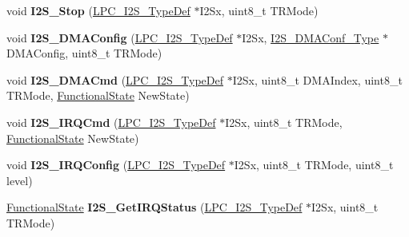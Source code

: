 \begin{DoxyCompactItemize}
\item 
\hypertarget{group___i2_s___public___functions_ga8eae165238c77e72233ac1713c8d7ba3}{void {\bfseries \-I2\-S\-\_\-\-Stop} (\hyperlink{struct_l_p_c___i2_s___type_def}{\-L\-P\-C\-\_\-\-I2\-S\-\_\-\-Type\-Def} $\ast$\-I2\-Sx, uint8\-\_\-t \-T\-R\-Mode)}\label{group___i2_s___public___functions_ga8eae165238c77e72233ac1713c8d7ba3}

\item 
\hypertarget{group___i2_s___public___functions_ga6fa654a968a57d14c35e3237aa7a8318}{void {\bfseries \-I2\-S\-\_\-\-D\-M\-A\-Config} (\hyperlink{struct_l_p_c___i2_s___type_def}{\-L\-P\-C\-\_\-\-I2\-S\-\_\-\-Type\-Def} $\ast$\-I2\-Sx, \hyperlink{struct_i2_s___d_m_a_conf___type}{\-I2\-S\-\_\-\-D\-M\-A\-Conf\-\_\-\-Type} $\ast$\-D\-M\-A\-Config, uint8\-\_\-t \-T\-R\-Mode)}\label{group___i2_s___public___functions_ga6fa654a968a57d14c35e3237aa7a8318}

\item 
\hypertarget{group___i2_s___public___functions_gaec76e4a5b237d1157cfb3bbfde94cd14}{void {\bfseries \-I2\-S\-\_\-\-D\-M\-A\-Cmd} (\hyperlink{struct_l_p_c___i2_s___type_def}{\-L\-P\-C\-\_\-\-I2\-S\-\_\-\-Type\-Def} $\ast$\-I2\-Sx, uint8\-\_\-t \-D\-M\-A\-Index, uint8\-\_\-t \-T\-R\-Mode, \hyperlink{group___l_p_c___types___public___types_gac9a7e9a35d2513ec15c3b537aaa4fba1}{\-Functional\-State} \-New\-State)}\label{group___i2_s___public___functions_gaec76e4a5b237d1157cfb3bbfde94cd14}

\item 
\hypertarget{group___i2_s___public___functions_gac2b047a5954c798979850902e7750e64}{void {\bfseries \-I2\-S\-\_\-\-I\-R\-Q\-Cmd} (\hyperlink{struct_l_p_c___i2_s___type_def}{\-L\-P\-C\-\_\-\-I2\-S\-\_\-\-Type\-Def} $\ast$\-I2\-Sx, uint8\-\_\-t \-T\-R\-Mode, \hyperlink{group___l_p_c___types___public___types_gac9a7e9a35d2513ec15c3b537aaa4fba1}{\-Functional\-State} \-New\-State)}\label{group___i2_s___public___functions_gac2b047a5954c798979850902e7750e64}

\item 
\hypertarget{group___i2_s___public___functions_ga36f04deedbad5e8a4ad94eb4ea4ca8b7}{void {\bfseries \-I2\-S\-\_\-\-I\-R\-Q\-Config} (\hyperlink{struct_l_p_c___i2_s___type_def}{\-L\-P\-C\-\_\-\-I2\-S\-\_\-\-Type\-Def} $\ast$\-I2\-Sx, uint8\-\_\-t \-T\-R\-Mode, uint8\-\_\-t level)}\label{group___i2_s___public___functions_ga36f04deedbad5e8a4ad94eb4ea4ca8b7}

\item 
\hypertarget{group___i2_s___public___functions_ga6ddb94a5e1d506d5dd067f6729dd3b4b}{\hyperlink{group___l_p_c___types___public___types_gac9a7e9a35d2513ec15c3b537aaa4fba1}{\-Functional\-State} {\bfseries \-I2\-S\-\_\-\-Get\-I\-R\-Q\-Status} (\hyperlink{struct_l_p_c___i2_s___type_def}{\-L\-P\-C\-\_\-\-I2\-S\-\_\-\-Type\-Def} $\ast$\-I2\-Sx, uint8\-\_\-t \-T\-R\-Mode)}\label{group___i2_s___public___functions_ga6ddb94a5e1d506d5dd067f6729dd3b4b}


\end{DoxyCompactItemize}
